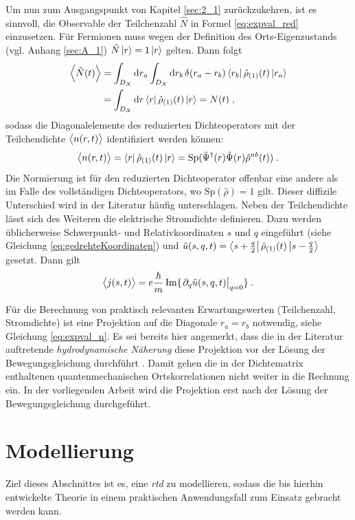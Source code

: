 Um nun zum Ausgangspunkt von Kapitel \ref{sec:2_1} zurückzukehren, ist es sinnvoll, die Observable der Teilchenzahl $\hat{N}$  in Formel \eqref{eq:expval_red} einzusetzen. Für Fermionen muss wegen der Definition des Orts-Eigenzustands (vgl. Anhang \ref{sec:A_1}) $\hat{N}\ket{r}=1\ket{r}$ gelten. Dann folgt
\begin{align*}
  \expval{\hat{N}(t)} &= \int_{D_X} \mathop{}\!\mathrm{d} r_a \int_{D_X} \mathop{}\!\mathrm{d} r_b \, \delta(r_a-r_b) \bra{r_b}\hat{\rho}_{(1)}(t) \ket{r_a} \\
   &= \int_{D_X} \mathop{}\!\mathrm{d} r \bra{r}\hat{\rho}_{(1)}(t) \ket{r} = N(t) \; ,
\end{align*}
sodass die Diagonalelemente des reduzierten Dichteoperators mit der Teilchendichte $\expval{n(r,t)}$ identifiziert werden können:
\begin{equation}
  \expval{n(r,t)} = \bra{r}\hat{\rho}_{(1)}(t) \ket{r} = \text{Sp}(\hat{\Psi}^{\dagger}(r)\hat{\Psi}(r)\hat{\rho}^{nb}(t))  \; .
  \label{eq:expval_n}
\end{equation}
Die Normierung ist für den reduzierten Dichteoperator offenbar eine andere als im Falle des vollständigen Dichteoperators, wo $\text{Sp}(\hat{\rho})=1$ gilt. Dieser diffizile Unterschied wird in der Literatur häufig unterschlagen. Neben der Teilchendichte lässt sich des Weiteren die elektrische Stromdichte definieren. Dazu werden üblicherweise Schwerpunkt- und Relativkoordinaten $s$ und $q$ eingeführt (siehe Gleichung \eqref{eq:gedrehteKoordinaten}) und $\tilde{u}(s,q,t) = \bra{s+\frac{q}{2}}\hat{\rho}_{(1)}(t) \ket{s-\frac{q}{2}}$ gesetzt. Dann gilt \cite{lukas1}
\begin{equation}
  \expval{j(s,t)} = e\frac{\hbar}{m}\operatorname{Im}\{\left. \partial_q \tilde{u}(s,q,t)\right\rvert_{q=0}\} \; .
  \label{eq:expval_j}
\end{equation}

Für die Berechnung von praktisch relevanten Erwartungswerten (Teilchenzahl, Stromdichte) ist eine Projektion auf die Diagonale $r_a=r_b$ notwendig, siehe Gleichung \eqref{eq:expval_n}. Es sei bereits hier angemerkt, dass die in der Literatur auftretende  \emph{hydrodynamische Näherung} diese Projektion vor der Lösung der Bewegungsgleichung durchführt \cite{wiedenhaus}. Damit gehen die in der Dichtematrix enthaltenen quantenmechanischen Ortskorrelationen nicht weiter in die Rechnung ein. In der vorliegenden Arbeit wird die Projektion erst nach der Lösung der Bewegungsgleichung durchgeführt.


\section{Modellierung}
\label{sec:modellierung}
Ziel dieses Abschnittes ist es, eine \emph{\ac{rtd}}  zu modellieren, sodass die bis hierhin entwickelte Theorie in einem praktischen Anwendungsfall zum Einsatz gebracht werden kann.

